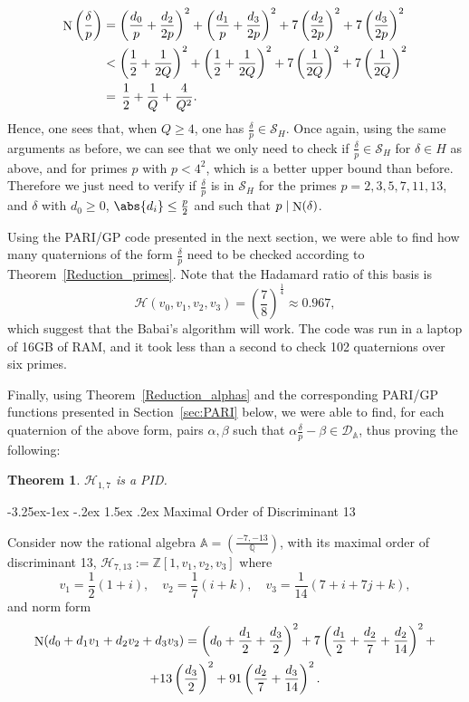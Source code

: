\documentclass[10pt]{article}
\makeatletter
\renewcommand\subsection{\@startsection{subsection}{2}{\z@}
  {-3.25ex\@plus -1ex \@minus -.2ex} {1.5ex \@plus .2ex}
  {\normalfont\normalsize\bfseries\boldmath}}
\newtheorem{theorem}{Theorem}
\theoremstyle{definition}
\newcommand\A{\mathbb{A}}
\newcommand\QQ{\mathbb{Q}}
\newcommand\ZZ{\mathbb{Z}}
\newcommand\DD{\mathcal{D}}
\newcommand\hh{\mathcal{H}}
\newcommand\SC{\mathcal{S}}
\newcommand\N{\mathop{\rm N}\nolimits}
\makeatother
\begin{document}
\begin{alignat*}{3}
  \N \left(\frac{\delta}{p} \right) & = \left( \frac{d_0}{p} +
    \frac{d_2}{2p} \right)^2 + \left( \frac{d_1}{p} + \frac{d_3}{2p}
  \right)^2 + 7 \left( \frac{d_2}{2p} \right)^2 + 7
  \left(  \frac{d_3}{2p} \right)^2 \\
  & < \left( \frac{1}{2} + \frac{1}{2Q} \right )^2 + \left(
    \frac{1}{2} + \frac{1}{2Q} \right )^2 + 7 \left( \frac{1}{2Q}
  \right )^2 + 7 \left( \frac{1}{2Q} \right )^2 \\
  & = \, \frac{1}{2} + \frac{1}{Q} + \frac{4}{Q^2}.
\end{alignat*}
%
Hence, one sees that, when $Q \geq 4$, one has
$\frac{\delta}{p} \in \SC_H$. Once again, using the same arguments as
before, we can see that we only need to check if
$\frac{\delta}{p} \in \SC_H$ for $\delta \in H$ as above, and for
primes $p$ with $p < 4^2$, which is a better upper bound than
before. Therefore we just need to verify if $\frac{\delta}{p}$ is in
$\SC_H$ for the primes $p = 2,3, 5, 7, 11, 13$, and $\delta$ with
$d_0\geq 0$, $\abs{d_i} \leq \frac{p}{2}$ and such that
$p \mid \N(\delta)$.

Using the PARI/GP \cite{PARI} code presented in the next section, we
were able to find how many quaternions of the form $\frac{\delta}{p}$
need to be checked according to Theorem~\ref{Reduction_primes}. Note
that the Hadamard ratio of this basis is
%
\[\hh(v_0,v_1,v_2,v_3) = \left( \frac{7}{8}\right)^{\frac{1}{4}}
  \approx 0.967,\]
%
which suggest that the Babai's algorithm will work. The code was run
in a laptop of 16GB of RAM, and it took less than a second to check
102 quaternions over six primes.

Finally, using Theorem~\ref{Reduction_alphas} and the corresponding
PARI/GP functions presented in Section~\ref{sec:PARI} below, we were
able to find, for each quaternion of the above form, pairs
$\alpha, \beta$ such that
$\alpha \frac{\delta}{p} - \beta \in \DD_\A$, thus proving the
following:

\begin{theorem}
  $\hh_{1,7}$ is a PID.
\end{theorem}
\subsection{Maximal Order of Discriminant 13}

Consider now the rational algebra
$\A = \left( \frac{-7,-13}{\QQ} \right)$, with its maximal order of
discriminant 13, $\hh_{7,13} := \ZZ[1, v_1,v_2,v_3]$ where
\[ v_1= \frac{1}{2}(1+i), \quad v_2 = \frac{1}{7}(i+k), \quad v_3 =
  \frac{1}{14} (7 + i + 7 j+ k),\] and norm form
%
\begin{multline*}
  \N ( d_0 + d_1 v_1 + d_2 v_2 + d_3 v_3 ) = \left( d_0 +
    \frac{d_1}{2} + \frac{d_3}{2}\right)^2 + 7 \left( \frac{d_1}{2} +
    \frac{d_2}{7} + \frac{d_2}{14} \right)^2 +\\+ 13 \left(
    \frac{d_3}{2} \right)^2 + 91\left( \frac{d_2}{7} + \frac{d_3}{14}
  \right)^2.
\end{multline*}
\end{document}
